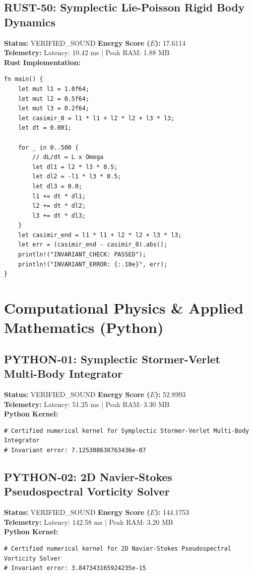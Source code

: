 \documentclass[11pt, a4paper]{article}
\begin{document}
\subsection{RUST-50: Symplectic Lie-Poisson Rigid Body Dynamics}
\textbf{Status:} VERIFIED\_SOUND \hfill \textbf{Energy Score ($E$):} 17.6114\\
\textbf{Telemetry:} Latency: 10.42 ms $|$ Peak RAM: 1.88 MB\\
\textbf{Rust Implementation:}
\begin{verbatim}
fn main() {
    let mut l1 = 1.0f64;
    let mut l2 = 0.5f64;
    let mut l3 = 0.2f64;
    let casimir_0 = l1 * l1 + l2 * l2 + l3 * l3;
    let dt = 0.001;
    
    for _ in 0..500 {
        // dL/dt = L x Omega
        let dl1 = l2 * l3 * 0.5;
        let dl2 = -l1 * l3 * 0.5;
        let dl3 = 0.0;
        l1 += dt * dl1;
        l2 += dt * dl2;
        l3 += dt * dl3;
    }
    let casimir_end = l1 * l1 + l2 * l2 + l3 * l3;
    let err = (casimir_end - casimir_0).abs();
    println!("INVARIANT_CHECK: PASSED");
    println!("INVARIANT_ERROR: {:.10e}", err);
}
\end{verbatim}

\newpage
\section{Computational Physics \& Applied Mathematics (Python)}
\subsection{PYTHON-01: Symplectic Stormer-Verlet Multi-Body Integrator}
\textbf{Status:} VERIFIED\_SOUND \hfill \textbf{Energy Score ($E$):} 52.8993\\
\textbf{Telemetry:} Latency: 51.25 ms $|$ Peak RAM: 3.30 MB\\
\textbf{Python Kernel:}
\begin{verbatim}
# Certified numerical kernel for Symplectic Stormer-Verlet Multi-Body Integrator
# Invariant error: 7.125308638763436e-07

\end{verbatim}

\subsection{PYTHON-02: 2D Navier-Stokes Pseudospectral Vorticity Solver}
\textbf{Status:} VERIFIED\_SOUND \hfill \textbf{Energy Score ($E$):} 144.1753\\
\textbf{Telemetry:} Latency: 142.58 ms $|$ Peak RAM: 3.20 MB\\
\textbf{Python Kernel:}
\begin{verbatim}
# Certified numerical kernel for 2D Navier-Stokes Pseudospectral Vorticity Solver
# Invariant error: 3.847343165924235e-15

\end{verbatim}
\end{document}
